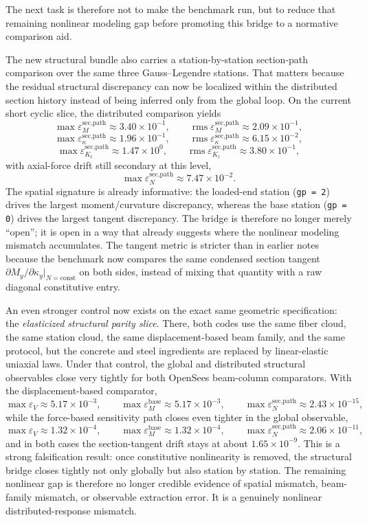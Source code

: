 The next task is therefore not to make the benchmark run, but to reduce that
remaining nonlinear modeling gap before promoting this bridge to a normative
comparison aid.

The new structural bundle also carries a station-by-station section-path
comparison over the same three Gauss--Legendre stations.  That matters because
the residual structural discrepancy can now be localized within the distributed
section history instead of being inferred only from the global loop.  On the
current short cyclic slice, the distributed comparison yields
\[
\max \varepsilon_{M}^{\text{sec,path}} \approx 3.40\times10^{-1},\qquad
\operatorname{rms}\varepsilon_{M}^{\text{sec,path}} \approx 2.09\times10^{-1},
\]
\[
\max \varepsilon_{\kappa}^{\text{sec,path}} \approx 1.96\times10^{-1},\qquad
\operatorname{rms}\varepsilon_{\kappa}^{\text{sec,path}} \approx 6.15\times10^{-2},
\]
\[
\max \varepsilon_{K_t}^{\text{sec,path}} \approx 1.47\times10^{0},\qquad
\operatorname{rms}\varepsilon_{K_t}^{\text{sec,path}} \approx 3.80\times10^{-1},
\]
with axial-force drift still secondary at this level,
\[
\max \varepsilon_{N}^{\text{sec,path}} \approx 7.47\times10^{-2}.
\]
The spatial signature is already informative: the loaded-end station
(\texttt{gp = 2}) drives the largest moment/curvature discrepancy, whereas the
base station (\texttt{gp = 0}) drives the largest tangent discrepancy.  The
bridge is therefore no longer merely ``open''; it is open in a way that
already suggests where the nonlinear modeling mismatch accumulates.
The tangent metric is stricter than in earlier notes because the benchmark now
compares the same condensed section tangent
\(\partial M_y/\partial \kappa_y\vert_{N=\mathrm{const}}\) on both sides,
instead of mixing that quantity with a raw diagonal constitutive entry.

An even stronger control now exists on the exact same geometric specification:
the \emph{elasticized structural parity slice}.  There, both codes use the same
fiber cloud, the same station cloud, the same displacement-based beam family,
and the same protocol, but the concrete and steel ingredients are replaced by
linear-elastic uniaxial laws.  Under that control, the global and distributed
structural observables close very tightly for both OpenSees beam-column
comparators.  With the displacement-based comparator,
\[
\max \varepsilon_{V} \approx 5.17\times10^{-3},\qquad
\max \varepsilon_{M}^{\text{base}} \approx 5.17\times10^{-3},\qquad
\max \varepsilon_{N}^{\text{sec,path}} \approx 2.43\times10^{-15},
\]
while the force-based sensitivity path closes even tighter in the global
observable,
\[
\max \varepsilon_{V} \approx 1.32\times10^{-4},\qquad
\max \varepsilon_{M}^{\text{base}} \approx 1.32\times10^{-4},\qquad
\max \varepsilon_{N}^{\text{sec,path}} \approx 2.06\times10^{-11},
\]
and in both cases the section-tangent drift stays at about
\(1.65\times10^{-9}\).
This is a strong falsification result: once constitutive nonlinearity is
removed, the structural bridge closes tightly not only globally but also
station by station.  The remaining nonlinear gap is therefore no longer
credible evidence of spatial mismatch, beam-family mismatch, or observable
extraction error.  It is a genuinely nonlinear distributed-response mismatch.

